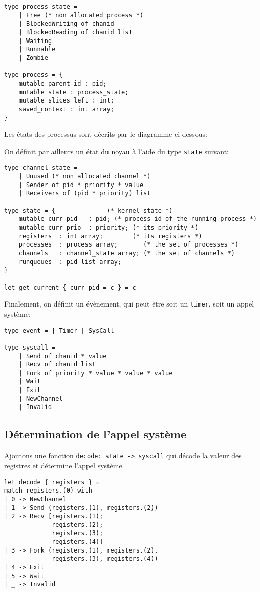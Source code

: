 \documentclass[french, toc]{../cs-classes/cs-classes}
\begin{document}
\begin{verbatim}
type process_state =
    | Free (* non allocated process *)
    | BlockedWriting of chanid
    | BlockedReading of chanid list
    | Waiting
    | Runnable
    | Zombie

type process = {
    mutable parent_id : pid;
    mutable state : process_state;
    mutable slices_left : int;
    saved_context : int array;
}
\end{verbatim}

\noindent Les états des processus sont décrits par le diagramme ci-dessous:


\noindent On définit par ailleurs un état du noyau à l'aide du type \texttt{state} suivant:
\begin{verbatim}
type channel_state =
    | Unused (* non allocated channel *)
    | Sender of pid * priority * value
    | Receivers of (pid * priority) list

type state = {              (* kernel state *)
    mutable curr_pid   : pid; (* process id of the running process *)
    mutable curr_prio  : priority; (* its priority *)
    registers  : int array;        (* its registers *)
    processes  : process array;       (* the set of processes *)
    channels   : channel_state array; (* the set of channels *)
    runqueues  : pid list array;
}

let get_current { curr_pid = c } = c
\end{verbatim}

\noindent Finalement, on définit un évènement, qui peut être soit un \texttt{timer}, soit un appel système:
\begin{verbatim}
type event = | Timer | SysCall

type syscall =
    | Send of chanid * value
    | Recv of chanid list
    | Fork of priority * value * value * value
    | Wait
    | Exit
    | NewChannel
    | Invalid
\end{verbatim}

\subsection{Détermination de l'appel système}
Ajoutons une fonction \texttt{decode: state -> syscall} qui décode la valeur des registres et détermine l'appel système.
\begin{verbatim}
let decode { registers } =
match registers.(0) with
| 0 -> NewChannel
| 1 -> Send (registers.(1), registers.(2))
| 2 -> Recv [registers.(1);
             registers.(2);
             registers.(3);
             registers.(4)]
| 3 -> Fork (registers.(1), registers.(2),
             registers.(3), registers.(4))
| 4 -> Exit
| 5 -> Wait
| _ -> Invalid
\end{verbatim}
\end{document}

